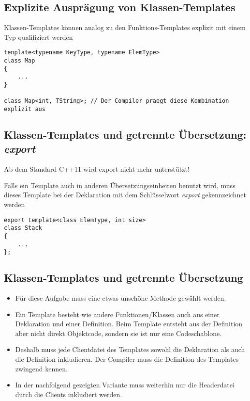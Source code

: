 \subsection{Explizite Ausprägung von Klassen-Templates}
Klassen-Templates können analog zu den Funktions-Templates explizit mit einem Typ qualifiziert werden
\begin{minipage}{\linewidth}
\vspace{-\baselineskip}
\begin{lstlisting}
tenplate<typename KeyType, typename ElemType>
class Map
{
	...
}

class Map<int, TString>; // Der Compiler praegt diese Kombination explizit aus
\end{lstlisting}
\end{minipage}

\subsection{Klassen-Templates und getrennte Übersetzung: \emph{export}}
\begin{achtung}
	Ab dem Standard C++11 wird export nicht mehr unterstützt!
\end{achtung}
Falls ein Template auch in anderen Übersetzungseinheiten benutzt wird, muss dieses Template bei der Deklaration mit dem Schlüsselwort \emph{export} gekennzeichnet werden\\
\begin{minipage}{0.5\linewidth}
\vspace{-\baselineskip}
\begin{lstlisting}
export template<class ElemType, int size>
class Stack
{
	...
};
\end{lstlisting}
\end{minipage}
\vfill
\pagebreak\newpage

\subsection{Klassen-Templates und getrennte Übersetzung}
\begin{itemize}
	\item Für diese Aufgabe muss eine etwas unschöne Methode gewählt werden.
	\item Ein Template besteht wie andere Funktionen/Klassen auch aus einer Deklaration und einer Definition. Beim Template entsteht aus der Definition aber nicht direkt Objektcode, sondern sie ist nur eine Codeschablone.
	\item Deshalb muss jede Clientdatei des Templates sowohl die Deklaration als auch die Definition inkludieren. Der Compiler muss die Definition des Templates zwingend kennen.
	\item In der nachfolgend gezeigten Variante muss weiterhin nur die Headerdatei durch die Clients inkludiert werden.
\end{itemize}


